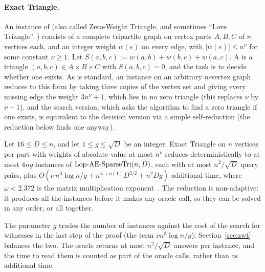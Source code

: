 \paragraph{Exact Triangle.}
An instance of  (also called Zero-Weight Triangle, and sometimes ``Love Triangle''~\cite{GP18}) consists of a complete tripartite graph on vertex parts $A,B,C$ of $n$ vertices each, and an integer weight $w(e)$ on every edge, with $|w(e)|\le n^\nu$ for some constant $\nu\ge1$. Let $S(a,b,c):=w(a,b)+w(b,c)+w(a,c)$. A  is a triangle $(a,b,c)\in A\times B\times C$ with $S(a,b,c)=0$, and the task is to decide whether one exists. As is standard, an instance on an arbitrary $n$-vertex graph reduces to this form by taking three copies of the vertex set and giving every missing edge the weight $3n^\nu+1$, which lies in no zero triangle (this replaces $\nu$ by $\nu+1$), and the search version, which asks the algorithm to find a zero triangle if one exists, is equivalent to the decision version via a simple self-reduction (the reduction below finds one anyway).

\begin{theorem}\label{thm:red}
Let $16\le D\le n$, and let $1\le g\le\sqrt D$ be an integer. Exact Triangle on $n$ vertices per part with weights of absolute value at most $n^\nu$ reduces deterministically to at most $4ng$ instances of $\mathrm{Lop}\text{-}\mathrm{AE}\text{-}\mathrm{SparseTri}(n,D)$, each with at most $n^2/\sqrt D$ query pairs, plus $O(\nu\,n^3\log n/g+n^{\omega+o(1)}D^{3/2}+n^2Dg)$ additional time, where $\omega<2.372$ is the matrix multiplication exponent~\cite{ADVXXZ25}. The reduction is non-adaptive: it produces all the instances before it makes any oracle call, so they can be solved in any order, or all together.
\end{theorem}

The parameter $g$ trades the number of instances against the cost of the search for witnesses in the last step of the proof (the term $\nu n^3\log n/g$); Section~\ref{sec:zwt} balances the two. The oracle returns at most $n^2/\sqrt D$ answers per instance, and the time to read them is counted as part of the oracle calls, rather than as additional time.

